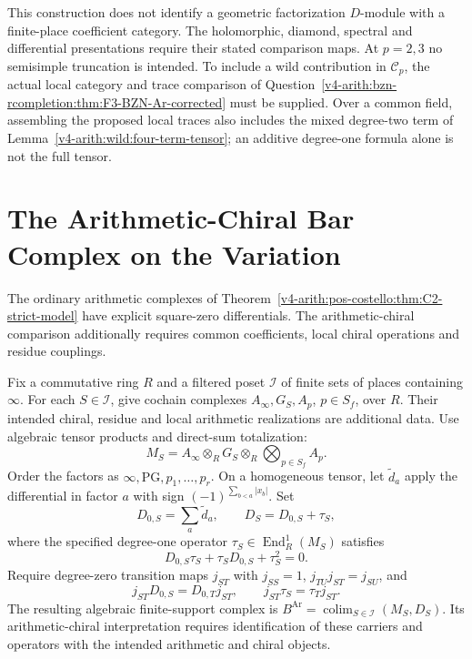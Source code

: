 This construction does not identify a geometric factorization
\(D\)-module with a finite-place coefficient category. The
holomorphic, diamond, spectral and differential presentations
require their stated comparison maps. At \(p=2,3\) no
semisimple truncation is intended. To include a wild contribution
in \(\mathcal C_p\), the actual local category and trace comparison
of Question~\ref{v4-arith:bzn-rcompletion:thm:F3-BZN-Ar-corrected}
must be supplied. Over a common field, assembling the proposed
local traces also includes the mixed degree-two term of
Lemma~\ref{v4-arith:wild:four-term-tensor}; an additive degree-one
formula alone is not the full tensor.

\section{The Arithmetic-Chiral Bar Complex on the Variation}
\label{v4-arith:platonic:bar}

The ordinary arithmetic complexes of
Theorem~\ref{v4-arith:pos-costello:thm:C2-strict-model} have explicit
square-zero differentials. The arithmetic-chiral comparison additionally
requires common coefficients, local chiral operations and residue couplings.

\begin{definition}
\label{v4-arith:platonic:def:bar}
Fix a commutative ring \(R\) and a filtered poset \(\mathcal I\) of finite
sets of places containing \(\infty\). For each \(S\in\mathcal I\), give
cochain complexes \(A_\infty,G_S,A_p\), \(p\in S_f\), over \(R\).
Their intended chiral, residue and local arithmetic realizations are
additional data. Use algebraic tensor products and direct-sum totalization:
\begin{equation}
\label{v4-arith:platonic:eq:finite-bar}
M_S=A_\infty\otimes_R G_S\otimes_R\bigotimes_{p\in S_f}A_p.
\end{equation}
Order the factors as \(\infty,\mathrm{PG},p_1,\ldots,p_r\).
On a homogeneous tensor, let \(\widetilde d_a\) apply the differential
in factor \(a\) with sign \((-1)^{\sum_{b<a}|x_b|}\). Set
\begin{equation}
\label{v4-arith:platonic:eq:bar-differential}
D_{0,S}=\sum_a\widetilde d_a,\qquad D_S=D_{0,S}+\tau_S,
\end{equation}
where the specified degree-one operator
\(\tau_S\in\operatorname{End}_R^1(M_S)\) satisfies
\begin{equation}
\label{v4-arith:platonic:eq:bar-local-differentials}
D_{0,S}\tau_S+\tau_SD_{0,S}+\tau_S^2=0.
\end{equation}
Require degree-zero transition maps \(j_{ST}\) with
\(j_{SS}=1\), \(j_{TU}j_{ST}=j_{SU}\), and
\[
j_{ST}D_{0,S}=D_{0,T}j_{ST},\qquad j_{ST}\tau_S=\tau_Tj_{ST}.
\]
The resulting algebraic finite-support complex is
\(B^{\mathrm{Ar}}=\operatorname*{colim}_{S\in\mathcal I}(M_S,D_S)\).
Its arithmetic-chiral interpretation requires identification of these
carriers and operators with the intended arithmetic and chiral objects.
\end{definition}

